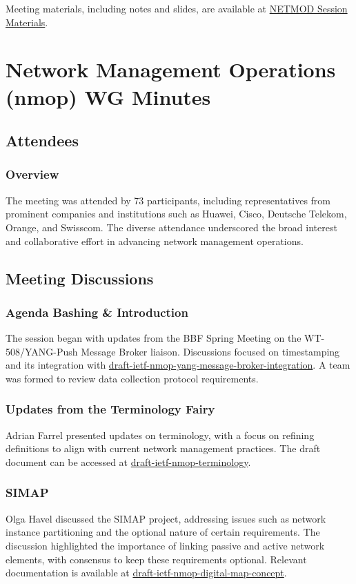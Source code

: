 \documentclass{article}
\begin{document}
Meeting materials, including notes and slides, are available at \href{https://datatracker.ietf.org/meeting/122/session/netmod}{NETMOD Session Materials}.


\newpage

\section{Network Management Operations (nmop) WG Minutes}

\subsection{Attendees}
\subsubsection{Overview}
The meeting was attended by 73 participants, including representatives from prominent companies and institutions such as Huawei, Cisco, Deutsche Telekom, Orange, and Swisscom. The diverse attendance underscored the broad interest and collaborative effort in advancing network management operations.

\subsection{Meeting Discussions}

\subsubsection{Agenda Bashing \& Introduction}
The session began with updates from the BBF Spring Meeting on the WT-508/YANG-Push Message Broker liaison. Discussions focused on timestamping and its integration with \href{https://datatracker.ietf.org/doc/html/draft-ietf-nmop-yang-message-broker-integration}{draft-ietf-nmop-yang-message-broker-integration}. A team was formed to review data collection protocol requirements.

\subsubsection{Updates from the Terminology Fairy}
Adrian Farrel presented updates on terminology, with a focus on refining definitions to align with current network management practices. The draft document can be accessed at \href{https://datatracker.ietf.org/doc/draft-ietf-nmop-terminology/}{draft-ietf-nmop-terminology}.

\subsubsection{SIMAP}
Olga Havel discussed the SIMAP project, addressing issues such as network instance partitioning and the optional nature of certain requirements. The discussion highlighted the importance of linking passive and active network elements, with consensus to keep these requirements optional. Relevant documentation is available at \href{https://datatracker.ietf.org/doc/draft-ietf-nmop-digital-map-concept/}{draft-ietf-nmop-digital-map-concept}.
\end{document}
